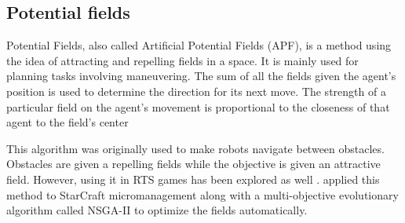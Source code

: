 \subsection{Potential fields}\label{subsec:potential-fields}

Potential Fields, also called Artificial Potential Fields (APF), is a
method using the idea of attracting and repelling fields in a
space. It is mainly used for planning tasks involving maneuvering.
The sum of all the fields given the agent's position is used to
determine the direction for its next move. The strength of a
particular field on the agent's movement is proportional to the
closeness of that agent to the field's center

This algorithm was originally used to make robots navigate between
obstacles. Obstacles are given a repelling fields while the objective
is given an attractive field. However, using it in RTS games has been
explored as well \cite{Hagelback08RTSPotentialFields}.
\citet{Svendsen12SCPotentialFieldsGP} applied this method to
StarCraft micromanagement along with a multi-objective evolutionary
algorithm called NSGA-II to optimize the fields automatically.
